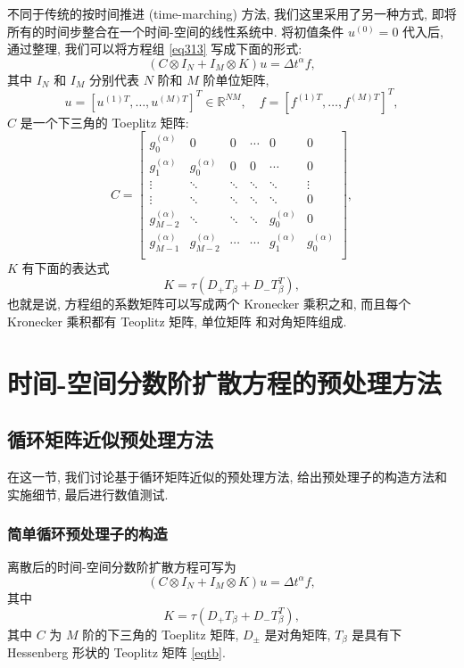 \documentclass{ecnumaster}
\begin{document}
不同于传统的按时间推进 (time-marching) 方法,
我们这里采用了另一种方式, 即将所有的时间步整合在一个时间-空间的线性系统中.
将初值条件 $u^{(0)} = 0$ 代入后, 通过整理,
我们可以将方程组 \eqref{eq313} 写成下面的形式:
\begin{equation}\label{eq316}
(C \otimes I_N + I_M \otimes K)u = \Delta t^\alpha f,
\end{equation}
其中 $I_N$ 和  $I_M$ 分别代表 $N$ 阶和 $M$ 阶单位矩阵,
$$ u = [u^{(1)T}, \dots, u^{(M)T}]^T \in \mathbb{R}^{NM},
  \quad f = [f^{(1)T}, \dots, f^{(M)T}]^T,
$$
$C$ 是一个下三角的 Toeplitz 矩阵:
\begin{equation}\label{eq317}
C = \left[ \begin{matrix} g_0^{(\alpha)} & 0 & 0 & \cdots & 0 & 0 \\
g_1^{(\alpha)} & g_0^{(\alpha)} & 0 & 0 & \cdots &  0 \\
\vdots & \ddots & \ddots & \ddots & \ddots & \vdots\\
\vdots & \ddots & \ddots & \ddots & \ddots & 0\\
g_{M-2}^{(\alpha)}& \ddots & \ddots & \ddots & g_0^{(\alpha)} & 0\\
g_{M-1}^{(\alpha)}& g_{M-2}^{(\alpha)} & \cdots & \cdots & g_1^{(\alpha)} & g_0^{(\alpha)}\\
\end{matrix} \right],
\end{equation}
$K$ 有下面的表达式
\begin{equation}
  K = \tau(D_+ T_{\beta} + D_-T_{\beta}^T),
\end{equation}
也就是说, 方程组的系数矩阵可以写成两个 Kronecker 乘积之和,
而且每个 Kronecker 乘积都有 Teoplitz 矩阵, 单位矩阵 和对角矩阵组成.


\chapter{时间-空间分数阶扩散方程的预处理方法}

\section{循环矩阵近似预处理方法}
在这一节, 我们讨论基于循环矩阵近似的预处理方法,
给出预处理子的构造方法和实施细节, 最后进行数值测试.

\subsection{简单循环预处理子的构造}
离散后的时间-空间分数阶扩散方程可写为
\begin{equation}
  (C \otimes I_N + I_M \otimes K)u = \Delta t^{\alpha}f,
\end{equation}
其中
$$
  K = \tau(D_+T_{\beta} + D_-T_{\beta}^T),
$$
其中 $C$ 为 $M$ 阶的下三角的 Toeplitz 矩阵, $D_{\pm}$ 是对角矩阵,
$T_{\beta}$ 是具有下 Hessenberg 形状的 Teoplitz 矩阵 \eqref{eqtb}.
\end{document}

